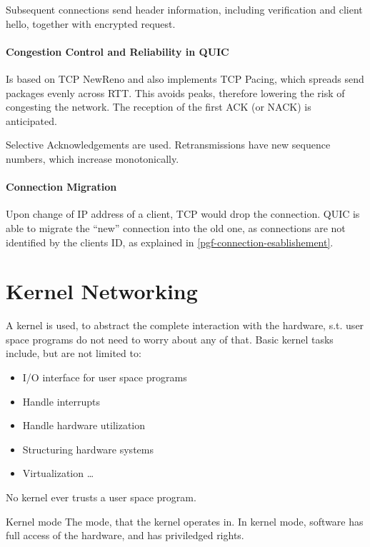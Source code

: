 \documentclass[english]{panikzettel}
\begin{document}
	Subsequent connections send header information, including verification and client hello, together with encrypted request.
	
	\paragraph{Congestion Control and Reliability in QUIC}
	\label{pgf-congestion-control-in-quic}
	
	Is based on TCP NewReno and also implements TCP Pacing, which spreads send packages evenly across RTT. 
	This avoids peaks, therefore lowering the risk of congesting the network.
	The reception of the first ACK (or NACK) is anticipated.

	Selective Acknowledgements are used. 
	Retransmissions have new sequence numbers, which increase monotonically.	

	\paragraph{Connection Migration}
	\label{pgf-connection-migration}
	
	Upon change of IP address of a client, TCP would drop the connection.
	QUIC is able to migrate the \enquote{new} connection into the old one, as connections are not identified by the clients ID, as explained in \cref{pgf-connection-esablishement}.
	
	\newpage
	\section{Kernel Networking}
	\label{s-kernel-networking}
	
	A kernel is used, to abstract the complete interaction with the hardware, s.t. user space programs do not need to worry about any of that.
	Basic kernel tasks include, but are not limited to:
	\begin{itemize}
		\item I/O interface for user space programs
		\item Handle interrupts
		\item Handle hardware utilization 
		\item Structuring hardware systems
		\item Virtualization
			\dots
	\end{itemize}

	No kernel ever trusts a user space program. 

	\begin{defi}{Kernel mode}
		The mode, that the kernel operates in. In kernel mode, software has full access of the hardware, and has priviledged rights.
	\end{defi}
\end{document}
